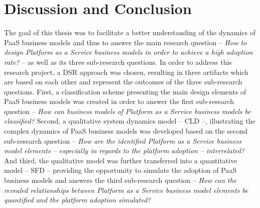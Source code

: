 \chapter{Discussion and Conclusion}\label{ch:dc}





The goal of this thesis was to facilitate a better understanding of the dynamics of \acf{PaaS} business models and thus to answer the main research question -- \textit{How to design Platform as a Service business models in order to achieve a high adoption rate?} -- as well as its three sub-research questions. In order to address this research project, a \acf{DSR} approach was chosen, resulting in three artifacts which are based on each other and represent the outcomes of the three sub-research questions. First, a classification scheme presenting the main design elements of \ac{PaaS} business models was created in order to answer the first sub-research question -- \textit{How can business models of Platform as a Service business models be classified?} Second, a qualitative system dynamics model -- \acf{CLD} --, illustrating the complex dynamics of \ac{PaaS} business models was developed based on the second sub-research question -- \textit{How are the identified Platform as a Service business model elements -- especially in regards to the platform adoption -- interrelated?} And third, the qualitative model was further transferred into a quantitative model -- \acf{SFD} -- providing the opportunity to simulate the adoption of \ac{PaaS} business models and answers the third sub-research question -- \textit{How can the revealed relationships between Platform as a Service business model elements be quantified and the platform adoption simulated?}

